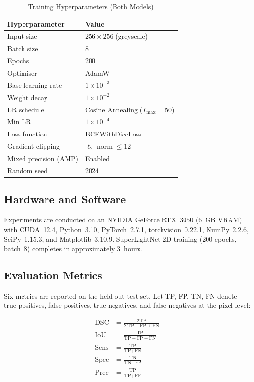 \documentclass[conference]{IEEEtran}
\begin{document}
\begin{table}[h]
\centering
\caption{Training Hyperparameters (Both Models)}
\label{tab:hyperparams}
\begin{tabular}{ll}
\toprule
\textbf{Hyperparameter} & \textbf{Value} \\
\midrule
Input size              & $256 \times 256$ (greyscale) \\
Batch size              & 8 \\
Epochs                  & 200 \\
Optimiser               & AdamW \\
Base learning rate      & $1 \times 10^{-3}$ \\
Weight decay            & $1 \times 10^{-2}$ \\
LR schedule             & Cosine Annealing ($T_\text{max}{=}50$) \\
Min LR                  & $1 \times 10^{-4}$ \\
Loss function           & BCEWithDiceLoss \\
Gradient clipping       & $\ell_2$ norm $\leq 12$ \\
Mixed precision (AMP)   & Enabled \\
Random seed             & 2024 \\
\bottomrule
\end{tabular}
\end{table}

\subsection{Hardware and Software}

Experiments are conducted on an NVIDIA GeForce RTX~3050 (6~GB VRAM)
with CUDA~12.4, Python~3.10, PyTorch~2.7.1, torchvision~0.22.1,
NumPy~2.2.6, SciPy~1.15.3, and Matplotlib~3.10.9. SuperLightNet-2D
training (200 epochs, batch~8) completes in approximately 3~hours.

\subsection{Evaluation Metrics}

Six metrics are reported on the held-out test set. Let TP, FP, TN,
FN denote true positives, false positives, true negatives, and false
negatives at the pixel level:

\begin{align}
  \text{DSC}  &= \frac{2\,\text{TP}}{2\,\text{TP}+\text{FP}+\text{FN}} \\
  \text{IoU}  &= \frac{\text{TP}}{\text{TP}+\text{FP}+\text{FN}} \\
  \text{Sens} &= \frac{\text{TP}}{\text{TP}+\text{FN}} \\
  \text{Spec} &= \frac{\text{TN}}{\text{TN}+\text{FP}} \\
  \text{Prec} &= \frac{\text{TP}}{\text{TP}+\text{FP}}
\end{align}
\end{document}
